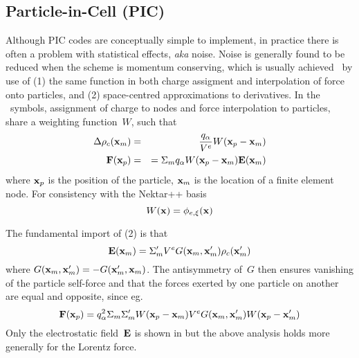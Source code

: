 \subsection{Particle-in-Cell (PIC)}\label{sec:picdetails}
Although PIC codes are conceptually simple to implement, in practice there is often 
a problem with statistical effects, \emph{aka} noise. Noise is generally found to be
reduced when the scheme is momentum conserving, which is usually
achieved~\cite[\S\,5-3-3]{hockneyeastwood} by use of (1) the same function in both
charge assigment and interpolation of force onto particles, and (2) space-centred
approximations to derivatives. In the \nep\ symbols, assignment of charge to nodes 
and force interpolation to particles, share a weighting function~$W$, such that
\begin{eqnarray}\label{eq:Wfunction}
\Delta \rho_c({\bf x}_m)&=&\frac{q_\alpha}{V^e} W({\bf x}_p-{\bf x}_m) \\
{\bf F}({\bf x}_p)&=&=\Sigma_m q_\alpha W({\bf x}_p-{\bf x}_m) {\bf E}({\bf x}_m)
\end{eqnarray}
where ${\bf x}_p$ is the position of the particle, ${\bf x}_m$ is the location
of a finite element node. For consistency with the Nektar++ basis 
\begin{equation}\label{eq:basisagree}
W({\bf x})= \phi_{e,\xi}({\bf x})
\end{equation}


The fundamental import of (2) is that 
\begin{equation}\label{eq:forcefromcharge}
{\bf E} ({\bf x}_m) = \Sigma_m' V^e G({\bf x}_m, {\bf x}_m') \rho_c({\bf x}_m')
\end{equation}
where $G({\bf x}_m, {\bf x}_m')= -G({\bf x}_m', {\bf x}_m)$. The antisymmetry of~$G$
then ensures vanishing of the particle self-force and that the forces exerted by
one particle on another are equal and opposite, since eg.\
\begin{equation}\label{eq:forceiszero}
{\bf F}({\bf x}_p)=q_\alpha^2 \Sigma_m \Sigma_m' W({\bf x}_p-{\bf x}_m) V^e G({\bf x}_m, {\bf x}_m') 
W({\bf x}_p-{\bf x}_m')
\end{equation}
Only the electrostatic field~${\bf E}$ is shown in 
but the above analysis holds more generally for the Lorentz force.
